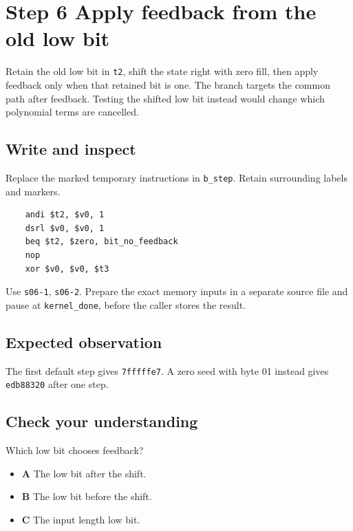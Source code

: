 \section{Step 6 Apply feedback from the old low bit}\label{crc-s06}

Retain the old low bit in \texttt{t2}, shift the state right with zero fill, then apply feedback only when that retained bit is one. The branch targets the common path after feedback. Testing the shifted low bit instead would change which polynomial terms are cancelled.

\subsection{Write and inspect}
Replace the marked temporary instructions in \texttt{b\_step}. Retain surrounding labels and markers.

\begin{verbatim}
    andi $t2, $v0, 1
    dsrl $v0, $v0, 1
    beq $t2, $zero, bit_no_feedback
    nop
    xor $v0, $v0, $t3
\end{verbatim}

Use \texttt{s06-1}, \texttt{s06-2}. Prepare the exact memory inputs in a separate source file and pause at \texttt{kernel\_done}, before the caller stores the result.

\subsection{Expected observation}
The first default step gives \texttt{7fffffe7}. A zero seed with byte 01 instead gives \texttt{edb88320} after one step.

\subsection{Check your understanding}
Which low bit chooses feedback?

\begin{itemize}
  \item \textbf{A} The low bit after the shift.
  \item \textbf{B} The low bit before the shift.
  \item \textbf{C} The input length low bit.
\end{itemize}
